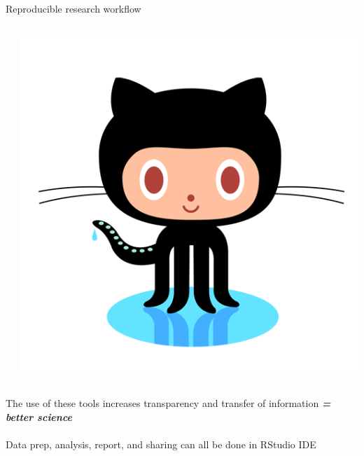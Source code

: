 \documentclass[serif]{beamer}\usepackage[]{graphicx}\usepackage[]{color}
\newcommand{\emtxt}[1]{\textbf{\textit{#1}}}
\begin{document}
\begin{frame}{Reproducible research workflow}
\begin{columns}
\begin{column}{0.23\textwidth}
\end{column}
\begin{column}{0.23\textwidth}
\centerline{\includegraphics[width = \textwidth]{fig/octocat.png}}
\end{column}
\end{columns}
\vspace{0.2in}
The use of these tools increases transparency and transfer of information \emtxt{= better science}\\~\\
Data prep, analysis, report, and sharing can all be done in RStudio IDE
\end{frame}
\end{document}
